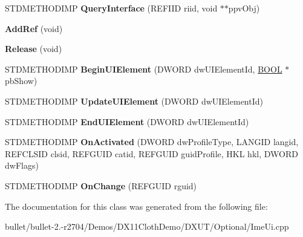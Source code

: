 \begin{DoxyCompactItemize}
\item 
\hypertarget{class_c_tsf_ui_less_mode_1_1_c_u_i_element_sink_aef42538317419a21c6a7d2586c4f7848}{S\+T\+D\+M\+E\+T\+H\+O\+D\+I\+M\+P {\bfseries Query\+Interface} (R\+E\+F\+I\+I\+D riid, void $\ast$$\ast$ppv\+Obj)}\label{class_c_tsf_ui_less_mode_1_1_c_u_i_element_sink_aef42538317419a21c6a7d2586c4f7848}

\item 
\hypertarget{class_c_tsf_ui_less_mode_1_1_c_u_i_element_sink_a0adba01412907deab33ca89b1e782155}{{\bfseries Add\+Ref} (void)}\label{class_c_tsf_ui_less_mode_1_1_c_u_i_element_sink_a0adba01412907deab33ca89b1e782155}

\item 
\hypertarget{class_c_tsf_ui_less_mode_1_1_c_u_i_element_sink_a614837a84f6218f8b423fdaabdd62b4d}{{\bfseries Release} (void)}\label{class_c_tsf_ui_less_mode_1_1_c_u_i_element_sink_a614837a84f6218f8b423fdaabdd62b4d}

\item 
\hypertarget{class_c_tsf_ui_less_mode_1_1_c_u_i_element_sink_a01268283a6255206b70d56245c9659d4}{S\+T\+D\+M\+E\+T\+H\+O\+D\+I\+M\+P {\bfseries Begin\+U\+I\+Element} (D\+W\+O\+R\+D dw\+U\+I\+Element\+Id, \hyperlink{_ice_types_8h_a050c65e107f0c828f856a231f4b4e788}{B\+O\+O\+L} $\ast$pb\+Show)}\label{class_c_tsf_ui_less_mode_1_1_c_u_i_element_sink_a01268283a6255206b70d56245c9659d4}

\item 
\hypertarget{class_c_tsf_ui_less_mode_1_1_c_u_i_element_sink_a577890e6b85ef744751962fce714445e}{S\+T\+D\+M\+E\+T\+H\+O\+D\+I\+M\+P {\bfseries Update\+U\+I\+Element} (D\+W\+O\+R\+D dw\+U\+I\+Element\+Id)}\label{class_c_tsf_ui_less_mode_1_1_c_u_i_element_sink_a577890e6b85ef744751962fce714445e}

\item 
\hypertarget{class_c_tsf_ui_less_mode_1_1_c_u_i_element_sink_a07fddc38fc85eb7c56aeba183e79eed8}{S\+T\+D\+M\+E\+T\+H\+O\+D\+I\+M\+P {\bfseries End\+U\+I\+Element} (D\+W\+O\+R\+D dw\+U\+I\+Element\+Id)}\label{class_c_tsf_ui_less_mode_1_1_c_u_i_element_sink_a07fddc38fc85eb7c56aeba183e79eed8}

\item 
\hypertarget{class_c_tsf_ui_less_mode_1_1_c_u_i_element_sink_ac5cf5de126205ae891712761911a2f86}{S\+T\+D\+M\+E\+T\+H\+O\+D\+I\+M\+P {\bfseries On\+Activated} (D\+W\+O\+R\+D dw\+Profile\+Type, L\+A\+N\+G\+I\+D langid, R\+E\+F\+C\+L\+S\+I\+D clsid, R\+E\+F\+G\+U\+I\+D catid, R\+E\+F\+G\+U\+I\+D guid\+Profile, H\+K\+L hkl, D\+W\+O\+R\+D dw\+Flags)}\label{class_c_tsf_ui_less_mode_1_1_c_u_i_element_sink_ac5cf5de126205ae891712761911a2f86}

\item 
\hypertarget{class_c_tsf_ui_less_mode_1_1_c_u_i_element_sink_aadc44466817927f52cc436bc4e47fb30}{S\+T\+D\+M\+E\+T\+H\+O\+D\+I\+M\+P {\bfseries On\+Change} (R\+E\+F\+G\+U\+I\+D rguid)}\label{class_c_tsf_ui_less_mode_1_1_c_u_i_element_sink_aadc44466817927f52cc436bc4e47fb30}

\end{DoxyCompactItemize}


The documentation for this class was generated from the following file\+:\begin{DoxyCompactItemize}
\item 
bullet/bullet-\/2.-\/r2704/\+Demos/\+D\+X11\+Cloth\+Demo/\+D\+X\+U\+T/\+Optional/Ime\+Ui.\+cpp\end{DoxyCompactItemize}
